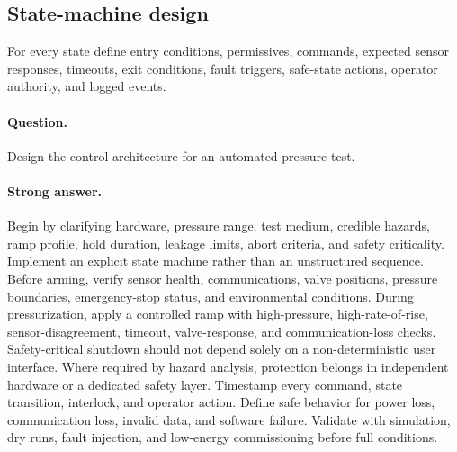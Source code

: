 \documentclass[11pt]{article}
\newcommand{\q}[1]{\paragraph{Question.} #1}
\newcommand{\ans}[1]{\paragraph{Strong answer.} #1}
\begin{document}
\subsection{State-machine design}
\begin{center}
\end{center}

For every state define entry conditions, permissives, commands, expected sensor
responses, timeouts, exit conditions, fault triggers, safe-state actions,
operator authority, and logged events.

\q{Design the control architecture for an automated pressure test.}
\ans{Begin by clarifying hardware, pressure range, test medium, credible hazards,
ramp profile, hold duration, leakage limits, abort criteria, and safety
criticality. Implement an explicit state machine rather than an unstructured
sequence. Before arming, verify sensor health, communications, valve positions,
pressure boundaries, emergency-stop status, and environmental conditions. During
pressurization, apply a controlled ramp with high-pressure, high-rate-of-rise,
sensor-disagreement, timeout, valve-response, and communication-loss checks.
Safety-critical shutdown should not depend solely on a non-deterministic user
interface. Where required by hazard analysis, protection belongs in independent
hardware or a dedicated safety layer. Timestamp every command, state transition,
interlock, and operator action. Define safe behavior for power loss, communication
loss, invalid data, and software failure. Validate with simulation, dry runs,
fault injection, and low-energy commissioning before full conditions.}
\end{document}
